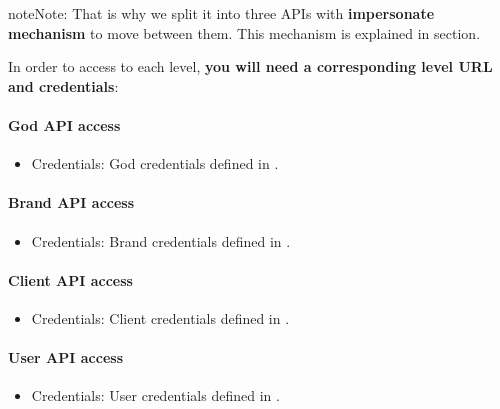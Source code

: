 \documentclass[letterpaper,10pt,english]{sphinxmanual}
\begin{document}
\begin{notice}{note}{Note:}
That is why we split it into three APIs with \textbf{impersonate mechanism} to move between them. This mechanism is
explained in {\hyperref[api_rest/use_case:use\string-case]{}} section.
\end{notice}

In order to access to each level, \textbf{you will need a corresponding level URL and credentials}:
\paragraph{God API access}
\begin{itemize}
\item {} 
Credentials: God credentials defined in {\hyperref[administration_portal/platform/main_operators:main\string-operators]{}}.

\end{itemize}
\paragraph{Brand API access}
\begin{itemize}
\item {} 
Credentials: Brand credentials defined in {\hyperref[administration_portal/platform/brands:brand\string-operators]{}}.

\end{itemize}
\paragraph{Client API access}
\begin{itemize}
\item {} 
Credentials: Client credentials defined in {\hyperref[administration_portal/brand/clients/operators:client\string-operators]{}}.

\end{itemize}
\paragraph{User API access}
\begin{itemize}
\item {} 
Credentials: User credentials defined in {\hyperref[administration_portal/client/vpbx/users:users]{}}.

\end{itemize}
\end{document}
